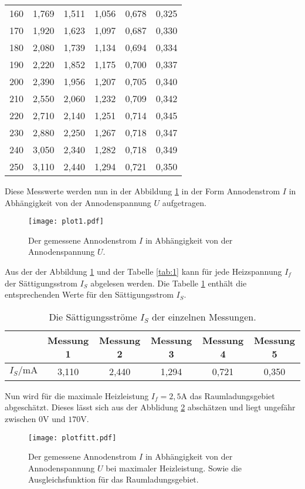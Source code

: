 \begin{table}
\begin{tabular}{c c c c c c}
  160 & 1,769 &  1,511 &  1,056 &  0,678 &  0,325\\
  170 & 1,920 &  1,623 &  1,097 &  0,687 &  0,330\\
  180 & 2,080 &  1,739 &  1,134 &  0,694 &  0,334\\
  190 & 2,220 &  1,852 &  1,175 &  0,700 &  0,337\\
  200 & 2,390 &  1,956 &  1,207 &  0,705 &  0,340\\
  210 & 2,550 &  2,060 &  1,232 &  0,709 &  0,342\\
  220 & 2,710 &  2,140 &  1,251 &  0,714 &  0,345\\
  230 & 2,880 &  2,250 &  1,267 &  0,718 &  0,347\\
  240 & 3,050 &  2,340 &  1,282 &  0,718 &  0,349\\
  250 & 3,110 &  2,440 &  1,294 &  0,721 &  0,350\\
  \bottomrule
 \end{tabular}
\end{table}
\FloatBarrier

Diese Messwerte werden nun in der Abbildung \ref{fig:1} in der Form
Annodenstrom $I$ in Abhängigkeit von der Annodenspannung $U$
aufgetragen.

\begin{figure}
 \centering
 \texttt{[image: plot1.pdf]}
 \caption{Der gemessene Annodenstrom $I$ in
 Abhängigkeit von der Annodenspannung $U$.}
 \label{fig:1}
\end{figure}
\FloatBarrier

Aus der der Abbildung \ref{fig:1} und der Tabelle \ref{tab:1}
kann für jede Heizspannung $I_f$ der
Sättigungsstrom $I_S$ abgelesen werden.
Die Tabelle \ref{tab:I_s} enthält die entsprechenden Werte für den Sättigungsstrom $I_S$.
\begin{table}
  \centering
  \caption{Die Sättigungsströme $I_S$ der einzelnen Messungen.}
  \label{tab:I_s}
  \begin{tabular}{c c c c c c}
  \toprule
   &  Messung 1 & Messung 2 & Messung 3 & Messung 4 & Messung 5\\ %
   \midrule
  $I_S/\si{\milli\ampere}$ & 3,110 & 2,440  & 1,294 & 0,721 & 0,350\\
  \bottomrule
  \end{tabular}
\end{table}
\FloatBarrier

Nun wird für die maximale Heizleistung $I_f=2,5\si{\ampere}$
das Raumladungsgebiet abgeschätzt.
Dieses lässt sich aus der Abblidung \ref{fig:fitt} abschätzen
und liegt ungefähr zwischen $0\si{\volt}$ und $170\si{\volt}$.
\begin{figure}
 \centering
 \texttt{[image: plotfitt.pdf]}
 \caption{Der gemessene Annodenstrom $I$ in Abhängigkeit von der Annodenspannung $U$ bei maximaler
Heizleistung. Sowie die Ausgleichsfunktion für das Raumladungsgebiet.}
 \label{fig:fitt}
\end{figure}
\FloatBarrier

